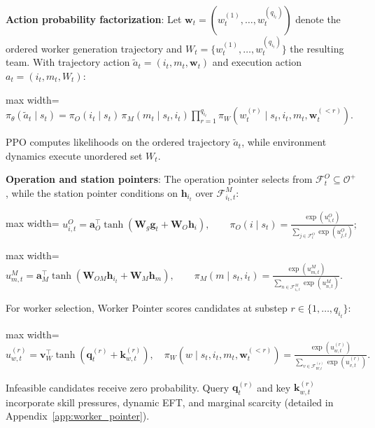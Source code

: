 \documentclass[journal,10pt]{IEEEtran}
\begin{document}
\textbf{Action probability factorization}:
Let $\mathbf w_t=(w_t^{(1)},\dots,w_t^{(q_{i_t})})$ denote the ordered worker generation trajectory and $W_t=\{w_t^{(1)},\dots,w_t^{(q_{i_t})}\}$ the resulting team. With trajectory action $\widetilde a_t=(i_t,m_t,\mathbf w_t)$ and execution action $a_t=(i_t,m_t,W_t)$:
\begin{center}
\begin{adjustbox}{max width=\linewidth}
$\displaystyle
\pi_\theta(\widetilde a_t\mid s_t) = \pi_O(i_t\mid s_t)\,\pi_M(m_t\mid s_t,i_t)\prod_{r=1}^{q_{i_t}}\pi_W\left(w_t^{(r)}\mid s_t,i_t,m_t,\mathbf w_t^{(<r)}\right).
$
\end{adjustbox}
\end{center}
PPO computes likelihoods on the ordered trajectory $\widetilde a_t$, while environment dynamics execute unordered set $W_t$.

\textbf{Operation and station pointers}:
The operation pointer selects from $\mathcal{F}_t^O\subseteq\mathcal{O}^+$, while the station pointer conditions on $\mathbf{h}_{i_t}$ over $\mathcal{F}_{i_t,t}^M$:
\begin{center}
\begin{adjustbox}{max width=\linewidth}
$\displaystyle
u_{i,t}^O = \mathbf a_O^{\top}\tanh(\mathbf W_g\mathbf g_t + \mathbf W_O\mathbf h_i), \qquad \pi_O(i\mid s_t) = \frac{\exp(u_{i,t}^O)}{\sum_{j\in\mathcal F_t^O}\exp(u_{j,t}^O)};
$
\end{adjustbox}
\end{center}
\begin{center}
\begin{adjustbox}{max width=\linewidth}
$\displaystyle
u_{m,t}^M = \mathbf a_M^{\top}\tanh(\mathbf W_{OM}\mathbf h_{i_t} + \mathbf W_M\mathbf h_m), \qquad \pi_M(m\mid s_t,i_t) = \frac{\exp(u_{m,t}^M)}{\sum_{n\in\mathcal F_{i_t,t}^M}\exp(u_{n,t}^M)}.
$
\end{adjustbox}
\end{center}
For worker selection, Worker Pointer scores candidates at substep $r\in\{1,\dots,q_{i_t}\}$:
\begin{center}
\begin{adjustbox}{max width=\linewidth}
$\displaystyle
u_{w,t}^{(r)} = \mathbf v_W^{\top}\tanh\left(\mathbf q_t^{(r)} + \mathbf k_{w,t}^{(r)}\right), \quad
\pi_W\left(w\mid s_t,i_t,m_t,\mathbf w_t^{(<r)}\right) = \frac{\exp(u_{w,t}^{(r)})}{\sum_{v\in\mathcal F_{W,t}^{(r)}}\exp(u_{v,t}^{(r)})}.
$
\end{adjustbox}
\end{center}
Infeasible candidates receive zero probability. Query $\mathbf q_t^{(r)}$ and key $\mathbf k_{w,t}^{(r)}$ incorporate skill pressures, dynamic EFT, and marginal scarcity (detailed in Appendix~\ref{app:worker_pointer}).
\end{document}
